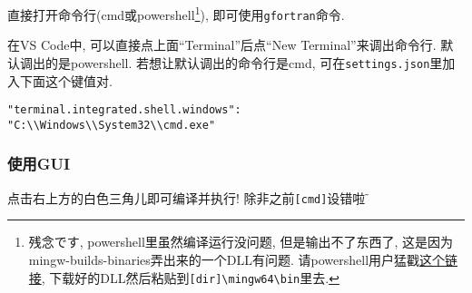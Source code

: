 直接打开命令行(cmd或powershell\footnote{残念です, powershell里虽然编译运行没问题, 但是输出不了东西了, 这是因为mingw-builds-binaries弄出来的一个DLL有问题. 请powershell用户猛戳\href{https://github.com/GasinAn/mingw64_gfortran_dll/archive/refs/heads/main.zip}{这个链接}, 下载好的DLL然后粘贴到\texttt{[dir]\textbackslash mingw64\textbackslash bin}里去.}), 即可使用\verb|gfortran|命令.

在VS Code中, 可以直接点上面``Terminal''后点``New Terminal''来调出命令行. 默认调出的是powershell. 若想让默认调出的命令行是cmd, 可在\verb|settings.json|里加入下面这个键值对.
\begin{verbatim}
"terminal.integrated.shell.windows":
"C:\\Windows\\System32\\cmd.exe"
\end{verbatim}

\subsubsection{使用GUI}
点击右上方的白色三角儿即可编译并执行! 除非之前\verb|[cmd]|设错啦$\!\text{\~{}}$
